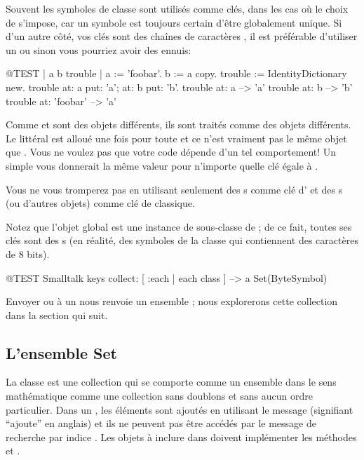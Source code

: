 \documentclass[a4paper,10pt,twoside]{book}
\begin{document}
Souvent les symboles de classe  sont utilis\'es comme cl\'es, dans les cas o\`u le choix de  s'impose, car un symbole est
toujours certain d'\^etre globalement unique.
Si d'un autre c\^ot\'e, vos cl\'es sont des chaînes de caract\`eres 
, il est pr\'ef\'erable d'utiliser un  ou sinon vous pourriez avoir des ennuis:

\begin{code}{@TEST | a b trouble |}
a := 'foobar'.
b := a copy.
trouble := IdentityDictionary new.
trouble at: a put: 'a'; at: b put: 'b'.
trouble at: a          --> 'a'
trouble at: b          --> 'b'
trouble at: 'foobar' --> 'a'
\end{code}

\noindent
Comme  et  sont des objets diff\'erents, ils sont trait\'es comme des objets diff\'erents.
Le litt\'eral \mbox{} est allou\'e une fois pour toute et
ce n'est vraiment pas le m\^eme objet que .
Vous ne voulez pas que votre code d\'epende d'un tel comportement!
Un simple  vous donnerait la m\^eme valeur pour n'importe quelle
cl\'e \'egale \`a .

Vous ne vous tromperez pas en utilisant
seulement des s comme cl\'e d' et
des s (ou d'autres objets) comme cl\'e de  classique.

Notez que l'objet global  est une instance de  sous-classe de  ; de ce fait, toutes ses
cl\'es sont des s (en r\'ealit\'e, des symboles de la classe  qui contiennent des caract\`eres de 8 bits).

\begin{code}{@TEST}
Smalltalk keys collect: [ :each | each class ] --> a Set(ByteSymbol)
\end{code}
\noindent
Envoyer  ou  \`a un  nous renvoie 
un ensemble ; nous explorerons cette collection dans la section
qui suit.

\subsection{L'ensemble Set}
La classe  est une collection qui se comporte comme un ensemble
dans le sens math\'ematique \ie comme une collection sans doublons
et sans aucun ordre particulier. Dans un , les \'el\'ements sont
ajout\'es en utilisant le message  (signifiant ``ajoute'' en anglais) et ils ne peuvent pas \^etre acc\'ed\'es par le message de recherche par indice . 
Les objets \`a inclure dans  doivent impl\'ementer les m\'ethodes  et \ct{=}.
\end{document}
